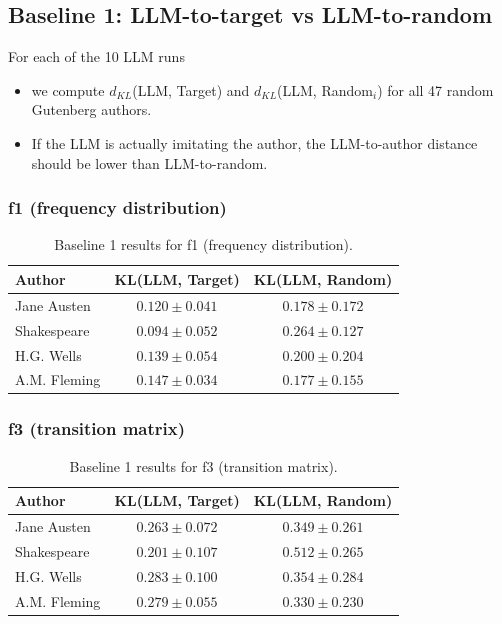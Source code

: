\documentclass{article}
\begin{document}
\subsection{Baseline 1: LLM-to-target vs LLM-to-random}

For each of the 10 LLM runs
\begin{itemize}
    \item we compute $d_{KL}$(LLM, Target) and $d_{KL}$(LLM, Random$_i$) for all 47 random Gutenberg authors.
    \item If the LLM is actually imitating the author, the LLM-to-author distance should be lower than LLM-to-random.
\end{itemize}

\subsubsection{f1 (frequency distribution)}

\begin{table}[htbp]
\centering
\begin{tabular}{lcc}
\toprule
Author & KL(LLM, Target) & KL(LLM, Random) \\
\midrule
Jane Austen & $0.120 \pm 0.041$ & $0.178 \pm 0.172$ \\
Shakespeare & $0.094 \pm 0.052$ & $0.264 \pm 0.127$ \\
H.G. Wells & $0.139 \pm 0.054$ & $0.200 \pm 0.204$ \\
A.M. Fleming & $0.147 \pm 0.034$ & $0.177 \pm 0.155$ \\
\bottomrule
\end{tabular}
\caption{Baseline 1 results for f1 (frequency distribution).}
\label{tab:baseline1_f1}
\end{table}

\subsubsection{f3 (transition matrix)}

\begin{table}[htbp]
\centering
\begin{tabular}{lcc}
\toprule
Author & KL(LLM, Target) & KL(LLM, Random) \\
\midrule
Jane Austen & $0.263 \pm 0.072$ & $0.349 \pm 0.261$ \\
Shakespeare & $0.201 \pm 0.107$ & $0.512 \pm 0.265$ \\
H.G. Wells & $0.283 \pm 0.100$ & $0.354 \pm 0.284$ \\
A.M. Fleming & $0.279 \pm 0.055$ & $0.330 \pm 0.230$ \\
\bottomrule
\end{tabular}
\caption{Baseline 1 results for f3 (transition matrix).}
\label{tab:baseline1_f3}
\end{table}
\end{document}
